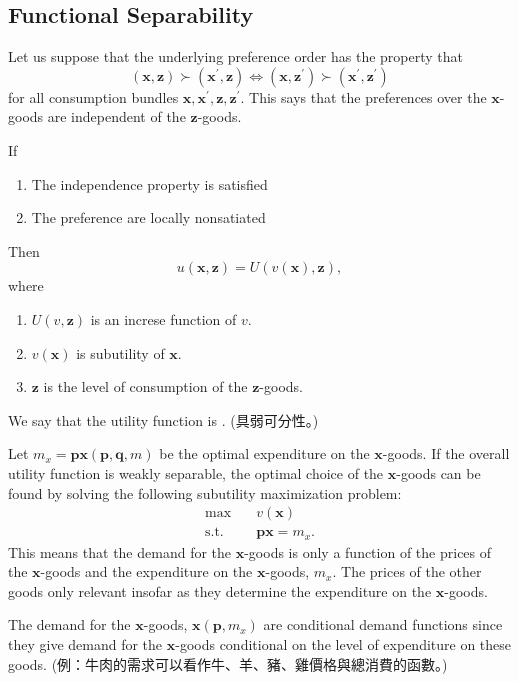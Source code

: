 \subsection*{Functional Separability}

Let us suppose that the underlying preference order has the property that 
\[ 
(\mathbf x, \mathbf z) \succ (\mathbf x^\prime, \mathbf z) \iff (\mathbf x, \mathbf z^\prime) \succ (\mathbf x^\prime, \mathbf z^\prime)
\]
for all consumption bundles \(\mathbf x, \mathbf x^\prime,\mathbf z, \mathbf z^\prime\). 
This says that the preferences over the \(\mathbf x\)-goods are independent of the \(\mathbf z\)-goods.

If 
\begin{enumerate}
    \item The independence property is satisfied
    \item The preference are locally nonsatiated
\end{enumerate}
Then 
\[
u (\mathbf x, \mathbf z ) = U(v(\mathbf x ), \mathbf z),
\] where 
\begin{enumerate}
    \item \( U(v, \mathbf z) \) is an increse function of \( v \).
    \item \( v(\mathbf x) \) is subutility of \( \mathbf x\).
    \item \( \mathbf z \) is the level of consumption of the \(\mathbf z\)-goods.
\end{enumerate}
We say that the utility function is . (具弱可分性。)

Let \(m_x = \mathbf{px}(\mathbf{p, q, }m) \) be the optimal expenditure on the \( \mathbf x \)-goods. 
If the overall utility function is weakly separable, the optimal choice of the \( \mathbf x \)-goods can be found by solving the following subutility maximization problem:
\begin{align*}
    \underset{}{\max} &\quad v(\mathbf{x}) \\
    \text{s.t.} &\quad \mathbf{px} = m_x.
\end{align*}
This means that the demand for the \( \mathbf x \)-goods is only a function of the prices of the \( \mathbf x \)-goods and the expenditure on the  \( \mathbf x \)-goods, \( m_x \).
The prices of the other goods only relevant insofar as they determine the expenditure on the \( \mathbf x \)-goods. 

The demand for the \( \mathbf x \)-goods, \( \mathbf x (\mathbf p, m_x) \) are conditional demand functions since they give demand for the \( \mathbf x \)-goods conditional on the level of expenditure on these goods.
(例：牛肉的需求可以看作牛、羊、豬、雞價格與總消費的函數。)

